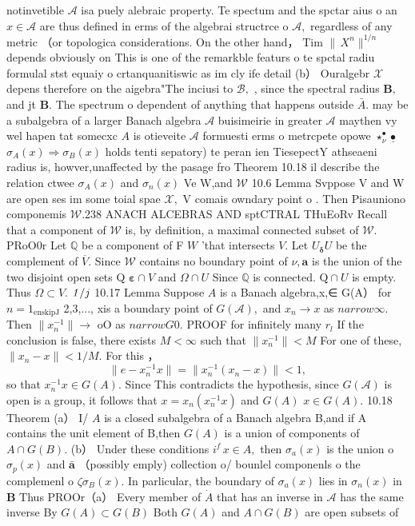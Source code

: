 notinvetible ${\mathcal A}$ isa puely alebraic property. Te spectum and the spctar aius o an $x\in{\mathcal{A}}$ are thus defined in erms of the algebrai structrce o ${\mathcal{A}},$ regardless of any metric （or topologica considerations. On the other hand， Tim $\|\,X^{n}\|^{1/n}$ depends obviously on This is one of the remarkble featurs o te spctal radiu formulal stst equaiy o crtanquanitiswic as im cly ife detail (b） Ouralgebr $\scriptstyle{\mathcal{X}}$ depens therefore on the aigebra"The inciusi to ${\mathcal{B}},$ , since the spectral radius ${\boldsymbol{B}},$ and jt ${\boldsymbol{B}}.$ The spectrum o dependent of anything that happens outside ${\bar{A}}.$ may be a subalgebra of a larger Banach algebra $\textstyle{\mathcal{A}}$ buisimeirie in greater $\textstyle{\mathcal{A}}$ maythen vy wel hapen tat somecxc $\scriptstyle{A}$ is otieveite $\textstyle{\mathcal{A}}$ formuesti erms o metrcpete opowe $\textstyle\star_{\nu}^{\!\bullet}{\underline{{\bullet}}}$ $\sigma_{A}(x)\Rightarrow\sigma_{B}(x)$ holds tenti sepatory) te peran ien TiesepectY athseaeni radius is, howver,unaffected by the pasage fro Theorem 10.18 il describe the relation ctwee $\sigma_{A}(x)$ and $\sigma_{n}(x)$ Ve W,and ${\mathcal{W}}$ 10.6 Lemma Svppose V and W are open ses im some toial spae ${\mathcal{X}},$ V comais owndary point o . Then Pisauniono componemis ${\mathcal{W}}.$238 ANACH ALCEBRAS AND sptCTRAL THuEoRv Recall that a component of ${\mathcal{W}}$ is, by definition, a maximal connected subset of ${\mathcal{W}}.$ PRoO0r Let $\mathbb{Q}$ be a component of F $W$ 'that intersects ${\mathit{V}}.$ Let $U_{\mathbf{\delta}}U$ be the complement of ${\overline{{V}}}.$ Since ${\mathcal{W}}$ contains no boundary point of $\nu,\mathbf{a}$ is the union of the two disjoint open sets Q $\mathbf{\varepsilon}\cap V$ and $\Omega\cap U$ Since $\mathbb{Q}$ is connected. $\mathrm{Q}\cap U$ is empty. Thus $\Omega\subset V.$ ${\it1}/j$ 10.17 Lemma Suppose $\scriptstyle A$ is a Banach algebra,x,∈ G(A） for $n=1_{\mathrm{enskipJ}}$ 2,3,..., xis a boundary point of $G({\mathcal{A}}),$ and $x_{n}\to x$ as $n arrow\infty.$ Then $\|x_{n}^{-1}\|\to$ oO as $n arrow G0.$ PROOF for infinitely many $r_{\mathit{l}}$ If the conclusion is false, there exists $M<\infty$ such that $\|x_{n}^{-1}\|<M$ For one of these, $\|x_{n}-x\|<1/M.$ For this ， $$ \|e-x_{n}^{-1}x\|=\|x_{n}^{-1}(x_{n}-x)\|<1, $$ so that $x_{n}^{-1}x\in G(A).$ Since This contradicts the hypothesis, since $G({\mathcal{A}})$ is open is a group, it follows that $x=x_{n}(x_{n}^{-1}x)$ and $\scriptstyle{G(A)}$ $x\in G(A).$ 10.18 Theorem (a） I/ $\scriptstyle A$ is a closed subalgebra of a Banach algebra B,and if A contains the unit element of B,then $\scriptstyle{G(A)}$ is a union of components of $A\cap G(B).$ (b） Under these conditions $i^{f}\,x\in A,$ then $\sigma_{a}(x)$ is the union o $\sigma_{p}(x)$ and $\bar{\boldsymbol{a}}$ （possibly emply) collection o/ bounlel componenls o the complemenl o $\zeta\sigma_{B}(x).$ In parlicular, the boundary of $\sigma_{a}(x)$ lies in $\sigma_{n}(x)$ in $\boldsymbol{B}$ Thus PROOr（a） Every member of $\scriptstyle{\dot{A}}$ that has an inverse in $\textstyle{\mathcal{A}}$ has the same inverse By $G(A)\subset G(B)$ Both $G(A)$ and $A\cap G(B)$ are open subsets of 